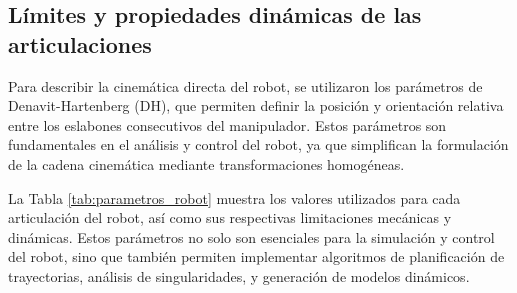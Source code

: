\subsection{Límites y propiedades dinámicas de las articulaciones} \label{subsec:limites_propiedades}


Para describir la cinemática directa del robot, se utilizaron los parámetros de Denavit-Hartenberg (DH), que permiten definir la posición y orientación relativa entre los eslabones consecutivos del manipulador. Estos parámetros son fundamentales en el análisis y control del robot, ya que simplifican la formulación de la cadena cinemática mediante transformaciones homogéneas.

La Tabla \ref{tab:parametros_robot} muestra los valores utilizados para cada articulación del robot, así como sus respectivas limitaciones mecánicas y dinámicas. Estos parámetros no solo son esenciales para la simulación y control del robot, sino que también permiten implementar algoritmos de planificación de trayectorias, análisis de singularidades, y generación de modelos dinámicos.
